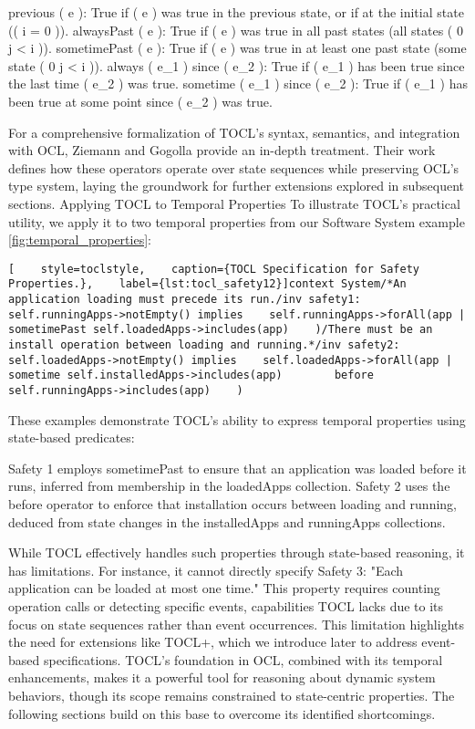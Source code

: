 previous ( e ): True if ( e ) was true in the previous state, or if at the initial state (( i = 0 )).
alwaysPast ( e ): True if ( e ) was true in all past states (all states ( 0 \leq j < i )).
sometimePast ( e ): True if ( e ) was true in at least one past state (some state ( 0 \leq j < i )).
always ( e_1 ) since ( e_2 ): True if ( e_1 ) has been true since the last time ( e_2 ) was true.
sometime ( e_1 ) since ( e_2 ): True if ( e_1 ) has been true at some point since ( e_2 ) was true.

For a comprehensive formalization of TOCL’s syntax, semantics, and integration with OCL, Ziemann and Gogolla \cite{TOCL} provide an in-depth treatment. Their work defines how these operators operate over state sequences while preserving OCL’s type system, laying the groundwork for further extensions explored in subsequent sections.
Applying TOCL to Temporal Properties
To illustrate TOCL’s practical utility, we apply it to two temporal properties from our Software System example \ref{fig:temporal_properties}:
\begin{lstlisting}[    style=toclstyle,    caption={TOCL Specification for Safety Properties.},    label={lst:tocl_safety12}]context System/*An application loading must precede its run./inv safety1:    self.runningApps->notEmpty() implies    self.runningApps->forAll(app |        sometimePast self.loadedApps->includes(app)    )/There must be an install operation between loading and running.*/inv safety2:    self.loadedApps->notEmpty() implies    self.loadedApps->forAll(app |        sometime self.installedApps->includes(app)        before self.runningApps->includes(app)    )\end{lstlisting}
These examples demonstrate TOCL’s ability to express temporal properties using state-based predicates:

Safety 1 employs sometimePast to ensure that an application was loaded before it runs, inferred from membership in the loadedApps collection.
Safety 2 uses the before operator to enforce that installation occurs between loading and running, deduced from state changes in the installedApps and runningApps collections.

While TOCL effectively handles such properties through state-based reasoning, it has limitations. For instance, it cannot directly specify Safety 3: "Each application can be loaded at most one time." This property requires counting operation calls or detecting specific events, capabilities TOCL lacks due to its focus on state sequences rather than event occurrences. This limitation highlights the need for extensions like TOCL+, which we introduce later to address event-based specifications.
TOCL’s foundation in OCL, combined with its temporal enhancements, makes it a powerful tool for reasoning about dynamic system behaviors, though its scope remains constrained to state-centric properties. The following sections build on this base to overcome its identified shortcomings.
